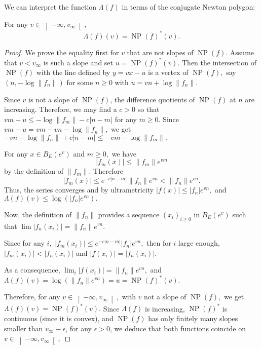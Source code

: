 \documentclass{lms}
\DeclareMathOperator{\NP}{NP}
\begin{document}
We can interpret the function $\Lambda(f)$ in terms of the conjugate Newton polygon:

\begin{prop} \label{prop : connexion sup Newton}
For any $v \in \left]-\infty, v_\infty \right[,$ \[ \Lambda (f) (v) = \NP(f)^*(v).\]
\end{prop}
\begin{proof}
We prove the equality first for $v$ that are not slopes of $\NP(f)$.  Assume that $v < v_\infty$ is such a slope and set $u = \NP(f)^*(v)$.
Then the intersection of $\NP(f)$ with the line defined by $y=vx-u$ is a vertex of $\NP(f),$ say
$(n, - \log \lVert f_n \rVert )$ for some $n \geq 0$ with $u = vn + \log \lVert f_n \rVert.$

Since $v$ is not a slope of $\NP(f)$, the difference quotients of $\NP(f)$ at $n$ are increasing.  Therefore, we may find a $c>0$ so that $vm-u \leq - \log \lVert f_m \rVert - c \vert n-m \vert$ for any $m\geq 0$.  Since $vm-u=vm-vn-\log \lVert f_n \rVert,$ we get $-vn-\log \lVert f_n \rVert + c \vert n-m \vert  \leq -vm-\log \lVert f_m \rVert .$

For any $x \in  B_E(e^v)$ and $m \geq 0,$ we have
\[
\vert f_m (x) \vert \leq \lVert f_m \rVert e^{vm}
\]
by the definition of $\lVert f_m \rVert$. Therefore
\[
\vert f_m (x) \vert \leq e^{-c \vert n-m \vert } \lVert f_n \rVert  e^{vn}< \lVert f_n \rVert e^{vn}.
\]
Thus, the series converges and by ultrametricity $ \vert f(x) \vert \leq \vert f_n \vert e^{vn},$ and $\Lambda (f)(v) \leq \log \left( \vert f_n \vert e^{vn} \right).$  

Now, the definition of $\lVert f_n \rVert$ provides a sequence $(x_i)_{i\geq 0}$ in $B_E(e^v)$ such that $\lim \vert f_n (x_i) \vert= \lVert f_n \rVert e^{vn}.$ 

Since for any $i,$ $\vert f_m (x_i) \vert \leq e^{-c \vert n-m \vert } \vert f_n \vert  e^{vn},$ then for $i$ large enough, $\vert f_m (x_i) \vert < \vert f_n (x_i) \vert $ and $\vert f(x_i) \vert = \vert f_n (x_i) \vert.$

As a consequence, $\lim_i \vert f(x_i) \vert = \lVert f_n \rVert e^{vn},$ and  $\Lambda (f)(v) = \log ( \lVert f_n \rVert e^{vn}) = u= \NP(f)^*(v).$

Therefore, for any $v \in \left] -\infty,v_{\infty} \right[,$ with $v$ not a slope of $\NP(f),$ we get $\Lambda (f)(v) =\NP(f)^*(v).$
Since $\Lambda (f)$ is increasing, $\NP(f)^*$ is continuous (since it is convex), and $\NP(f)$ has only finitely many slopes smaller than $v_\infty-\epsilon$, for any $\epsilon >0$, we deduce that both functions coincide on $v \in \left] -\infty,v_{\infty} \right[,$
\end{proof}
\end{document}
